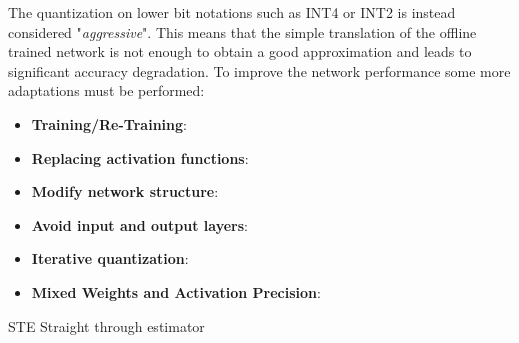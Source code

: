 The quantization on lower bit notations such as INT4 or INT2 is instead considered "\textit{aggressive}". 
This means that the simple translation of the offline trained network is not enough to obtain a good approximation and leads to significant accuracy degradation.
To improve the network performance some more adaptations must be performed:
\begin{itemize}
    \item \textbf{Training/Re-Training}: 
    \item \textbf{Replacing activation functions}:
    \item \textbf{Modify network structure}:
    \item \textbf{Avoid input and output layers}:
    \item \textbf{Iterative quantization}:
    \item \textbf{Mixed Weights and Activation Precision}:
\end{itemize}

STE Straight through estimator~\cite{bengio2013estimating}













